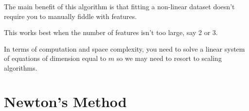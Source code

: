 \documentclass[12pt]{scrartcl}
\begin{document}
The main benefit of this algorithm is that fitting a non-linear dataset doesn't require you to manually fiddle with features.

\begin{note}
    This works best when the number of features isn't too large, say 2 or 3.
\end{note}

In terms of computation and space complexity, you need to solve a linear system of equations of dimension equal to $m$ so we may need to resort to scaling algorithms.

\section{Newton's Method}
\end{document}

